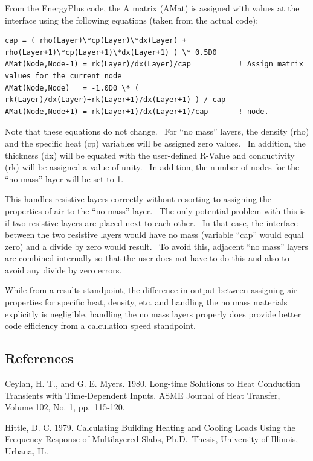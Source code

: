 From the EnergyPlus code, the A matrix (AMat) is assigned with values at the interface using the following equations (taken from the actual code):

\begin{lstlisting}
cap = ( rho(Layer)\*cp(Layer)\*dx(Layer) + rho(Layer+1)\*cp(Layer+1)\*dx(Layer+1) ) \* 0.5D0
AMat(Node,Node-1) = rk(Layer)/dx(Layer)/cap           ! Assign matrix values for the current node
AMat(Node,Node)   = -1.0D0 \* ( rk(Layer)/dx(Layer)+rk(Layer+1)/dx(Layer+1) ) / cap
AMat(Node,Node+1) = rk(Layer+1)/dx(Layer+1)/cap       ! node.
\end{lstlisting}

Note that these equations do not change.~ For ``no mass'' layers, the density (rho) and the specific heat (cp) variables will be assigned zero values.~ In addition, the thickness (dx) will be equated with the user-defined R-Value and conductivity (rk) will be assigned a value of unity.~ In addition, the number of nodes for the ``no mass'' layer will be set to 1.

This handles resistive layers correctly without resorting to assigning the properties of air to the ``no mass'' layer.~ The only potential problem with this is if two resistive layers are placed next to each other.~ In that case, the interface between the two resistive layers would have no mass (variable ``cap'' would equal zero) and a divide by zero would result.~ To avoid this, adjacent ``no mass'' layers are combined internally so that the user does not have to do this and also to avoid any divide by zero errors.

While from a results standpoint, the difference in output between assigning air properties for specific heat, density, etc. and handling the no mass materials explicitly is negligible, handling the no mass layers properly does provide better code efficiency from a calculation speed standpoint.

\subsection{References}\label{references-014}

Ceylan, H. T., and G. E. Myers. 1980. Long-time Solutions to Heat Conduction Transients with Time-Dependent Inputs. ASME Journal of Heat Transfer, Volume 102, No. 1, pp.~115-120.

Hittle, D. C. 1979. Calculating Building Heating and Cooling Loads Using the Frequency Response of Multilayered Slabs, Ph.D.~Thesis, University of Illinois, Urbana, IL.

